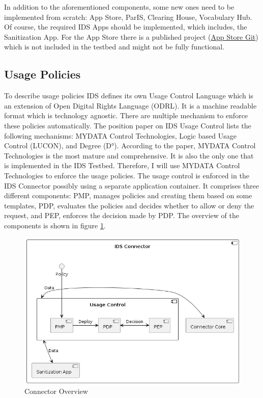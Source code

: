\documentclass{article}
\begin{document}
In addition to the aforementioned components, some new ones need to be implemented from scratch: App Store, ParIS, Clearing House, Vocabulary Hub. Of course, the required IDS Apps should be implemented, which includes, the Sanitization App. 
For the App Store there is a published project (\href{https://github.com/International-Data-Spaces-Association/IDS-AppStore}{App Store Git}) which is not included in the testbed and might not be fully functional.

\subsection*{Usage Policies}
To describe usage policies IDS defines its own Usage Control Language which is an extension of Open Digital Rights Language (ODRL). It is a machine readable format which is technology agnostic. There are multiple mechanism to enforce these policies automatically. The position paper on IDS Usage Control \cite{eitel_usage_2021} lists the following mechanisms: MYDATA Control Technologies, Logic based Usage Control (LUCON), and Degree (D°). According to the paper, MYDATA Control Technologies is the most mature and comprehensive. It is also the only one that is implemented in the IDS Testbed. Therefore, I will use MYDATA Control Technologies to enforce the usage policies. The usage control is enforced in the IDS Connector possibly using a separate application container. It comprises three different components: PMP, manages policies and creating them based on some templates, PDP, evaluates the policies and decides whether to allow or deny the request, and PEP, enforces the decision made by PDP. The overview of the components is shown in figure \ref{fig:connector}.

\begin{figure}[h]
    \centering
    \includegraphics[width=\textwidth]{connector}
    \caption{Connector Overview}
    \label{fig:connector}
\end{figure}
\end{document}
